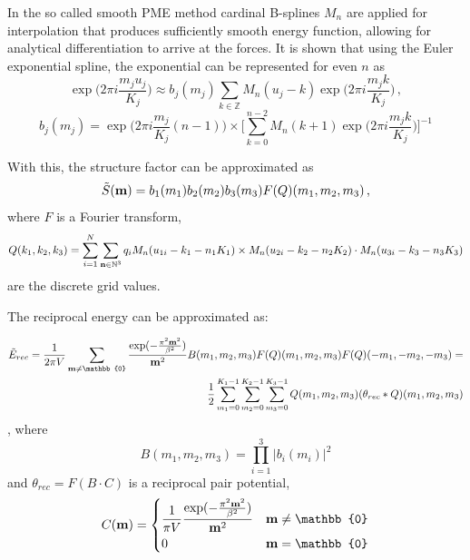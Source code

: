 \documentclass[12pt,a4paper]{report}
\newcommand{\draft}[1]{#1}
\begin{document}
In the so called smooth PME method \cite{spme} cardinal B-splines $M_n$ are applied for interpolation that produces sufficiently smooth energy function, allowing for analytical differentiation to arrive at the forces.
It is shown that using the Euler exponential spline, the exponential can be represented for even $n$ as
\[\exp\Big(2\pi i\frac{m_j u_j}{K_j}\Big) \approx b_j(m_j) \sum\limits_{k\in \mathbb{Z}}M_n(u_j - k)\exp\Big(2\pi i\frac{m_j k}{K_j}\Big)\,,\]
\begin{equation}\label{BSpline}
b_j(m_j) = \exp\Big(2\pi i\frac{m_j}{K_j}(n-1)\Big) \times \Big[\sum\limits_{k=0}^{n-2}M_n(k + 1)\exp\Big(2\pi i\frac{m_j k}{K_j}\Big) \Big]^{-1}
\end{equation}

With this, the structure factor can be approximated as
\[\tilde{S}(\bold{m}) = b_1(m_1) b_2(m_2)b_3(m_3) F(Q)(m_1, m_2, m_3)\,,\]
where $F$ is a Fourier transform,
\begin{equation} \label{Qspread}
Q(k_1, k_2, k_3) = \sum\limits_{i=1}^N \sum\limits_{\bold{n} \in \mathbb{N}^3} q_i M_n(u_{1i} -k_1 - n_1 K_1)\times M_n(u_{2i} -k_2 - n_2 K_2) \cdot M_n(u_{3i} -k_3 - n_3 K_3)
\end{equation}
are the discrete grid values.

The reciprocal energy can be approximated as:

\begin{equation}  \label{Erecfull}
\begin{split}
\tilde{E}_{rec} = \frac{1}{2 \pi V}\sum\limits_{\bold{m} \neq \mathbb{0}}\frac{\exp(-\frac{\pi^2\bold{m}^2}{\beta^2})}{\bold{m}^2} B(m_1, m_2, m_3) F(Q)(m_1, m_2, m_3)F(Q)(-m_1, -m_2, -m_3)= \\
\frac{1}{2}\sum\limits_{m_1 = 0}^{K_1 -1}\sum\limits_{m_2 = 0}^{K_2 -1}\sum\limits_{m_3 = 0}^{K_3 -1}Q(m_1, m_2, m_3)(\theta_{rec} \ast Q)(m_1, m_2, m_3)
\end{split}
\end{equation}, where 
\begin{equation} 
B(m_1, m_2, m_3) = \prod\limits_{i=1}^3 \lvert b_i(m_i) \rvert ^2
\end{equation}
and $\theta_{rec} = F(B\cdot C)$ is a reciprocal pair potential, 
\[C(\bold{m}) = \begin{dcases} 
\frac{1}{\pi V} \frac{\exp(-\frac{\pi^2\bold{m}^2}{\beta^2})}{\bold{m}^2} & \bold{m} \neq \mathbb{0}\\
0  & \bold{m} = \mathbb{0}
\end{dcases}
\]
\end{document}
